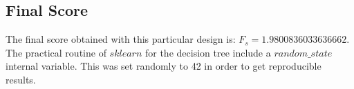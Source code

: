 \documentclass[a4paper]{article}
\begin{document}
\subsection{Final Score}
The final score obtained with this particular design is: $F_s = 1.9800836033636662$. The practical routine of $sklearn$ for the decision tree include a $random\_state$ internal variable. This was set randomly to 42 in order to get reproducible results.
\end{document}
